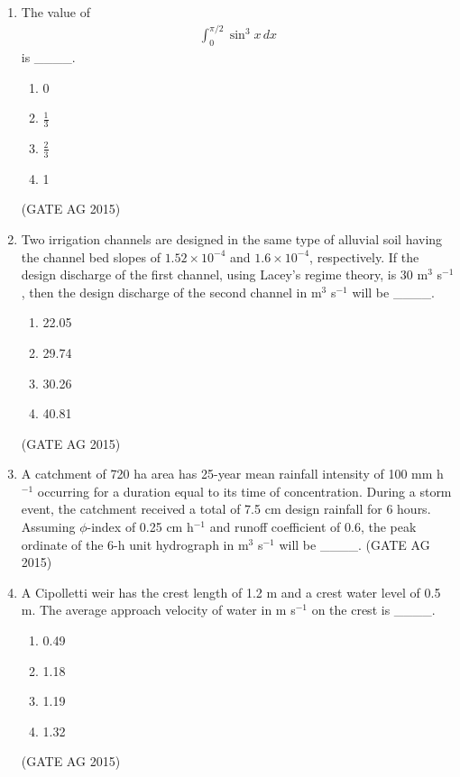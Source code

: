 \documentclass[journal,12pt,onecolumn]{IEEEtran}
\theoremstyle{remark}
\begin{document}
\begin{enumerate}
\item 
The value of 
\begin{align*}
\int_{0}^{\pi/2} \sin^{3}x \, dx
\end{align*}
is \_\_\_\_.
\begin{multicols}{4}
\begin{enumerate}
    \item 0
    \item $\tfrac{1}{3}$
    \item $\tfrac{2}{3}$
    \item 1
\end{enumerate}
\end{multicols}
\hfill{(GATE AG 2015)}

\item 
Two irrigation channels are designed in the same type of alluvial soil having the channel bed slopes of $1.52 \times 10^{-4}$ and $1.6 \times 10^{-4}$, respectively. If the design discharge of the first channel, using Lacey's regime theory, is 30 m$^{3}$ s$^{-1}$, then the design discharge of the second channel in m$^{3}$ s$^{-1}$ will be \_\_\_\_.
\begin{multicols}{4}
\begin{enumerate}
    \item 22.05
    \item 29.74
    \item 30.26
    \item 40.81
\end{enumerate}
\end{multicols}
\hfill{(GATE AG 2015)}

\item 
A catchment of 720 ha area has 25-year mean rainfall intensity of 100 mm h$^{-1}$ occurring for a duration equal to its time of concentration. During a storm event, the catchment received a total of 7.5 cm design rainfall for 6 hours. Assuming $\phi$-index of 0.25 cm h$^{-1}$ and runoff coefficient of 0.6, the peak ordinate of the 6-h unit hydrograph in m$^{3}$ s$^{-1}$ will be \_\_\_\_.
\hfill{(GATE AG 2015)}

\item 
A Cipolletti weir has the crest length of 1.2 m and a crest water level of 0.5 m. The average approach velocity of water in m s$^{-1}$ on the crest is \_\_\_\_.
\begin{multicols}{4}
\begin{enumerate}
    \item 0.49
    \item 1.18
    \item 1.19
    \item 1.32
\end{enumerate}
\end{multicols}
\hfill{(GATE AG 2015)}


\end{enumerate}
\end{document}
